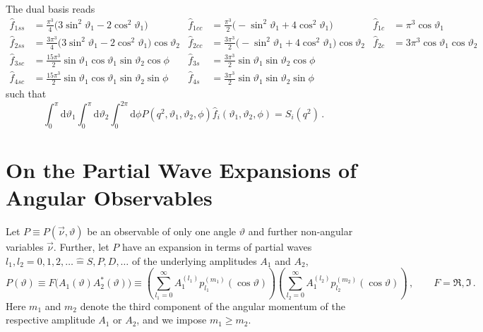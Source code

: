 \documentclass[aps,prd,reprint,nofootinbib,preprintnumbers]{revtex4}
\newcommand{\dd}{\text{d}}
\renewcommand{\theta}{\vartheta}
\begin{document}
The dual basis reads
\begin{equation}
    \begin{aligned}
        \hat f_{1ss} & = \frac{\pi^3}{4}\big(3 \sin^2\theta_1 - 2 \cos^2\theta_1\big) &
        \hat f_{1cc} & = \frac{\pi^3}{2}\big(- \sin^2\theta_1 + 4 \cos^2\theta_1\big) &
        \hat f_{1c}  & = \pi^3 \cos\theta_1\\
        \hat f_{2ss} & = \frac{3\pi^3}{4}\big(3 \sin^2\theta_1 - 2 \cos^2\theta_1\big) \cos\theta_2 &
        \hat f_{2cc} & = \frac{3\pi^3}{2}\big(- \sin^2\theta_1 + 4 \cos^2\theta_1\big) \cos\theta_2 &
        \hat f_{2c}  & = 3\pi^3 \cos\theta_1   \cos\theta_2 \\
        \hat f_{3sc} & = \frac{15\pi^3}{2}\sin\theta_1 \cos\theta_1 \sin\theta_2 \cos\phi &
        \hat f_{3s}  & = \frac{3\pi^3}{2} \sin\theta_1              \sin\theta_2 \cos\phi \\
        \hat f_{4sc} & = \frac{15\pi^3}{2}\sin\theta_1 \cos\theta_1 \sin\theta_2 \sin\phi &
        \hat f_{4s}  & = \frac{3\pi^3}{2} \sin\theta_1              \sin\theta_2 \sin\phi
    \end{aligned}
\end{equation}
such that
\begin{equation}
    \int_0^\pi \dd \theta_1 \int_0^\pi \dd \theta_2 \int_0^{2\pi} \dd \phi P(q^2, \theta_1, \theta_2, \phi) \hat{f}_i(\theta_1, \theta_2, \phi) = S_i(q^2)\,.
\end{equation}


\section{On the Partial Wave Expansions of Angular Observables}
\label{app:partial-waves}

Let $P \equiv P(\vec{\nu},\theta)$ be an observable of only one angle $\theta$ and further non-angular variables $\vec{\nu}$. Further, let
$P$ have an expansion in terms of partial waves $l_1, l_2 = 0,1,2,\dots \hat{=} S,P,D,\dots$ of the underlying amplitudes $A_1$ and $A_2$,
\begin{equation}
    \label{eq:def-partial-wave-observable}
    P(\theta) \equiv F\big(A_1(\theta) A_2^*(\theta)\big) \equiv \left(\sum_{l_1=0}^\infty A_1^{(l_1)} p_{l_1}^{(m_1)}(\cos\theta)\right) \left(\sum_{l_2=0}^\infty A_1^{(l_2)} p_{l_2}^{(m_2)}(\cos\theta)\right)\,,\qquad F=\Re{},\Im{}\,.
\end{equation}
Here $m_1$ and $m_2$ denote the third component of the angular momentum of the respective amplitude $A_1$ or $A_2$, and we impose $m_1 \geq m_2$.\\
\end{document}
